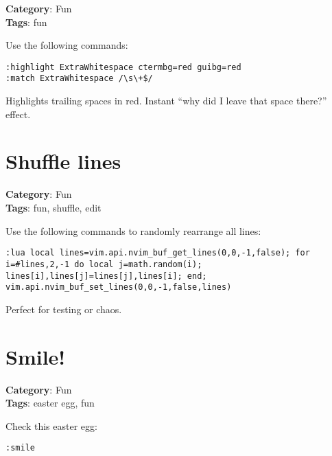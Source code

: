 {{{{{\textbf{Category}: Fun\\ \textbf{Tags}: fun
\vspace{0.5cm}

Use the following commands:

\begin{Exa*}{}
\begin{Verbatim}[fontsize=\footnotesize, breaklines, breakanywhere]
:highlight ExtraWhitespace ctermbg=red guibg=red
:match ExtraWhitespace /\s\+$/
\end{Verbatim}
\end{Exa*}

Highlights trailing spaces in red. Instant “why did I leave that space there?” effect.

\section{Shuffle lines}

\textbf{Category}: Fun\\ \textbf{Tags}: fun, shuffle, edit
\vspace{0.5cm}

Use the following commands to randomly rearrange all lines:

\begin{Exa*}{}
\begin{Verbatim}[fontsize=\footnotesize, breaklines, breakanywhere]
:lua local lines=vim.api.nvim_buf_get_lines(0,0,-1,false); for i=#lines,2,-1 do local j=math.random(i); lines[i],lines[j]=lines[j],lines[i]; end; vim.api.nvim_buf_set_lines(0,0,-1,false,lines)
\end{Verbatim}
\end{Exa*}

Perfect for testing or chaos.

\section{Smile!}

\textbf{Category}: Fun\\ \textbf{Tags}: easter egg, fun
\vspace{0.5cm}

Check this easter egg:

\begin{Exa*}{}
\begin{Verbatim}[fontsize=\footnotesize, breaklines, breakanywhere]
:smile
\end{Verbatim}
\end{Exa*}

}}}}}
